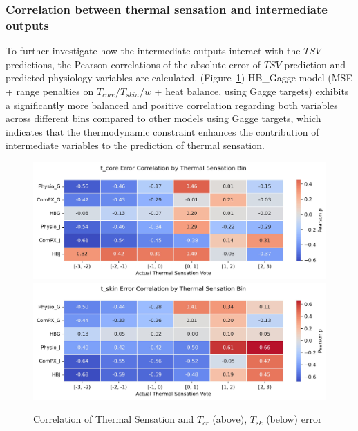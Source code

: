 \subsubsection{Correlation between thermal sensation and intermediate outputs}

To further investigate how the intermediate outputs interact with the $TSV$ predictions, the Pearson correlations of the absolute error of $TSV$ prediction and predicted physiology variables are calculated. (Figure~\ref{fig:error-corr})  HB\_Gagge model (MSE + range penalties on $T_{core}/T_{skin}/w$ + heat balance, using Gagge targets) exhibits a significantly more balanced and positive correlation regarding both variables across different bins compared to other models using Gagge targets, which indicates that the thermodynamic constraint enhances the contribution of intermediate variables to the prediction of thermal sensation.

\begin{figure}[htbp]
    \centering
    \includegraphics[width=\linewidth]{figures/t_core_ordered_bin_correlations_2.jpg}
    \includegraphics[width=\linewidth]{figures/t_skin_ordered_bin_correlations_2.jpg}
    \caption{Correlation of Thermal Sensation and $T_{cr}$ (above), $T_{sk}$ (below) error}
    \label{fig:error-corr}
\end{figure}

